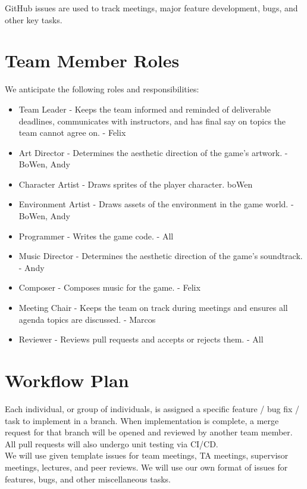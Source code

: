 \documentclass{article}
\begin{document}
GitHub issues are used to track meetings, major feature development, bugs, and other key tasks.\\



\section{Team Member Roles}

We anticipate the following roles and responsibilities:
\begin{itemize}
\item{Team Leader - Keeps the team informed and reminded of deliverable deadlines, communicates with instructors, and has final say on topics the team cannot agree on. - Felix}
\item{Art Director - Determines the aesthetic direction of the game’s artwork. - BoWen, Andy}
\item{Character Artist - Draws sprites of the player character. boWen}
\item{Environment Artist - Draws assets of the environment in the game world. - BoWen, Andy}
\item{Programmer - Writes the game code. - All}
\item{Music Director - Determines the aesthetic direction of the game’s soundtrack. - Andy}
\item{Composer - Composes music for the game. - Felix}
\item{Meeting Chair - Keeps the team on track during meetings and ensures all agenda topics are discussed. - Marcos}
\item{Reviewer - Reviews pull requests and accepts or rejects them. - All}
\end{itemize}


\section{Workflow Plan}

Each individual, or group of individuals, is assigned a specific feature / bug fix / task to implement in a branch. When implementation is complete, a merge request for that branch will be opened and reviewed by another team member. All pull requests will also undergo unit testing via CI/CD.\\

We will use given template issues for team meetings, TA meetings, supervisor meetings, lectures, and peer reviews. We will use our own format of issues for features, bugs, and other miscellaneous tasks.\\
\end{document}

